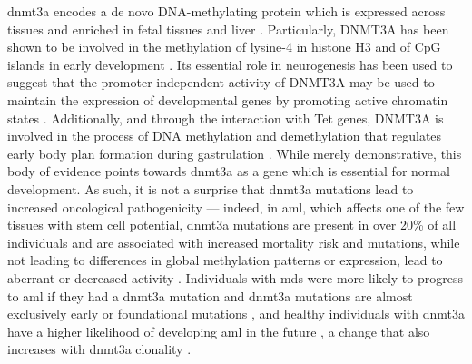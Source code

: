 \Ac{dnmt3a} encodes a de novo DNA-methylating protein \cite{Yanagisawa2002-op} which is expressed across tissues and enriched in fetal tissues and liver \cite{Robertson1999-dp}. Particularly, DNMT3A has been shown to be involved in the methylation of lysine-4 in histone H3 \cite{Ooi2007-pu} and of CpG islands in early development \cite{Smallwood2011-to}. Its essential role in neurogenesis has been used to suggest that the promoter-independent activity of DNMT3A may be used to maintain the expression of developmental genes by promoting active chromatin states \cite{Wu2010-ig}. Additionally, and through the interaction with Tet genes, DNMT3A is involved in the process of DNA methylation and demethylation that regulates early body plan formation during gastrulation \cite{Dai2016-kl}. While merely demonstrative, this body of evidence points towards \ac{dnmt3a} as a gene which is essential for normal development. As such, it is not a surprise that \ac{dnmt3a} mutations lead to increased oncological pathogenicity --- indeed, in \ac{aml}, which affects one of the few tissues with stem cell potential, \ac{dnmt3a} mutations are present in over 20\% of all individuals and are associated with increased mortality risk \cite{Ley2010-yk} and mutations, while not leading to differences in global methylation patterns or expression, lead to aberrant or decreased activity \cite{Yan2011-ug}. Individuals with \ac{mds} were more likely to progress to \ac{aml} if they had a \ac{dnmt3a} mutation \cite{Walter2011-ua} and \ac{dnmt3a} mutations are almost exclusively early or foundational mutations \cite{Shlush2014-di,Miller2013-cw}, and healthy individuals with \ac{dnmt3a} have a higher likelihood of developing \ac{aml} in the future \cite{Gerstung2017-bm,Abelson2018-wh}, a change that also increases with \ac{dnmt3a} clonality \cite{Desai2018-pj}. 

